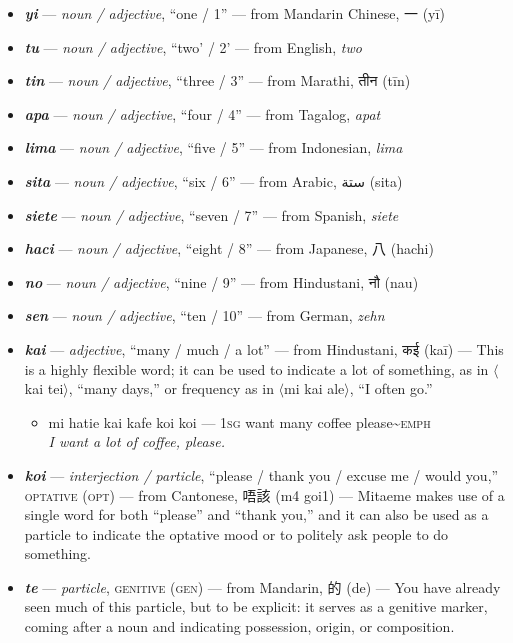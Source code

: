 \documentclass[a4paper, titlepage]{article}
\begin{document}
\begin{itemize}
	\item \textbf{\textit{yi}} —  \textit{noun / adjective}, ``one / 1'' — from Mandarin Chinese, 一 (yī)
	\item \textbf{\textit{tu}} —  \textit{noun / adjective}, ``two' / 2' — from English, \textit{two}
	\item \textbf{\textit{tin}} —  \textit{noun / adjective}, ``three / 3'' — from Marathi, {\hmfont तीन} (tīn)
	\item \textbf{\textit{apa}} —  \textit{noun / adjective}, ``four / 4'' — from Tagalog, \textit{apat}
	\item \textbf{\textit{lima}} —  \textit{noun / adjective}, ``five / 5'' — from Indonesian, \textit{lima}
	\item \textbf{\textit{sita}} —  \textit{noun / adjective}, ``six / 6'' — from Arabic, {\afont  ستة } (sita)
	\item \textbf{\textit{siete}} —  \textit{noun / adjective}, ``seven / 7'' — from Spanish, \textit{siete}
	\item \textbf{\textit{haci}} —  \textit{noun / adjective}, ``eight / 8'' — from Japanese, 八 (hachi)
	\item \textbf{\textit{no}} —  \textit{noun / adjective}, ``nine / 9'' — from Hindustani, {\hmfont नौ} (nau)
	\item \textbf{\textit{sen}} —  \textit{noun / adjective}, ``ten / 10'' — from German, \textit{zehn}
	\item \textbf{\textit{kai}} —  \textit{adjective}, ``many / much / a lot'' — from Hindustani, {\hmfont कई} (kaī) — This is a highly flexible word; it can be used to indicate a lot of something, as in $\langle$kai tei$\rangle$, ``many days,'' or frequency as in $\langle$mi kai ale$\rangle$, ``I often go.''
	\begin{itemize}
		\item mi hatie kai kafe koi koi — \textsc{1sg} want many coffee please\textasciitilde{}\textsc{emph} \\\textit{I want a lot of coffee, please.}
	\end{itemize}
	\item \textbf{\textit{koi}} —  \textit{interjection / particle}, ``please / thank you / excuse me / would you,'' \textsc{optative (opt)} — from Cantonese, 唔該 (m4 goi1) — Mitaeme makes use of a single word for both ``please'' and ``thank you,'' and it can also be used as a particle to indicate the optative mood or to politely ask people to do something.
	\item \textbf{\textit{te}} —  \textit{particle}, \textsc{genitive (gen)} — from Mandarin, 的 (de) — You have already seen much of this particle, but to be explicit: it serves as a genitive marker, coming after a noun and indicating possession, origin, or composition.

\end{itemize}
\end{document}
